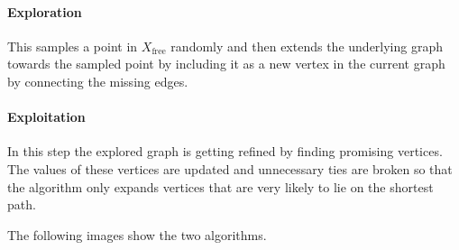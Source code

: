 \documentclass[conference]{IEEEtran}
\begin{document}
\paragraph{Exploration}
This samples a point in $X_\text{free}$ randomly and then extends the underlying graph towards the sampled point by including it as a new vertex in the current graph by connecting the missing edges. \cite{OktayArslan.December2015}\\
\paragraph{Exploitation}
In this step the explored graph is getting refined by finding promising vertices. The values of these vertices are updated and unnecessary ties are broken so that the algorithm only expands vertices that are very likely to lie on the shortest path.

The following images show the two algorithms.
\end{document}
